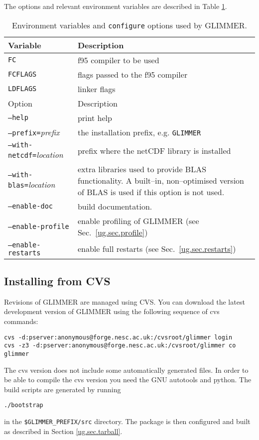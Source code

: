 The options and relevant environment variables are described in Table \ref{ug.tab.env}. 
%
\begin{table}[htbp]
  \centering
  \begin{tabular}{|l|p{8cm}|}
    \hline
    Variable & Description \\
    \hline
    \texttt{FC} & f95 compiler to be used \\
    \texttt{FCFLAGS} & flags passed to the f95 compiler \\
    \texttt{LDFLAGS} & linker flags\\
    \hline
    Option  & Description \\
    \hline
    \texttt{--help} & print help \\
    \texttt{--prefix=}{\it prefix} & the installation prefix, e.g. \texttt{GLIMMER} \\
    \texttt{--with-netcdf=}{\it location} & prefix where the netCDF library is installed \\
    \texttt{--with-blas=}{\it location} & extra libraries used to provide BLAS functionality. A built--in, non--optimised version of BLAS is used if this option is not used. \\
    \texttt{--enable-doc} & build documentation.\\
    \texttt{--enable-profile} & enable profiling of GLIMMER (see Sec.~\ref{ug.sec.profile})\\
    \texttt{--enable-restarts} & enable full restarts (see Sec.~\ref{ug.sec.restarts})\\
    \hline
  \end{tabular}
  \caption{Environment variables and \texttt{configure} options used by GLIMMER.}
  \label{ug.tab.env}
\end{table}

\subsection{Installing from CVS}
Revisions of GLIMMER are managed using CVS. You can download the latest development version of GLIMMER using the following sequence of cvs commands:
\begin{verbatim}
cvs -d:pserver:anonymous@forge.nesc.ac.uk:/cvsroot/glimmer login
cvs -z3 -d:pserver:anonymous@forge.nesc.ac.uk:/cvsroot/glimmer co glimmer
\end{verbatim}

The cvs version does not include some automatically generated files. In order to be able to compile the cvs version you need the GNU autotools and python. The build scripts are generated by running
\begin{verbatim}
./bootstrap
\end{verbatim}
in the \texttt{\$GLIMMER\_PREFIX/src} directory. The package is then configured and built as described in Section \ref{ug.sec.tarball}.
%

